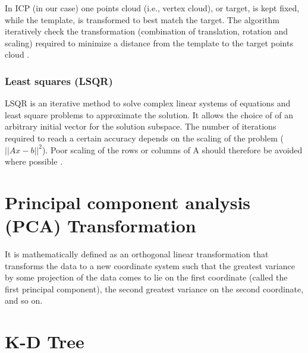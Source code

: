 \documentclass[../structure.tex]{subfiles}
\begin{document}
In ICP (in our case) one points cloud (i.e., vertex cloud), or target, is kept fixed, while the template, is transformed to best match the target. The algorithm iteratively check the transformation (combination of translation, rotation and scaling) required to minimize a distance from the template to the target points cloud \cite{Zhang1994}. 

		 \subsubsection{Least squares (LSQR)}
		 LSQR is an iterative method to solve complex linear systems of equations and least square problems to approximate the solution. It allows the choice of of an arbitrary initial vector for the solution subspace. The number of iterations required to reach a certain accuracy depends on the scaling of the problem ($ ||Ax-b||^2 $).  Poor scaling of the rows or columns of A should therefore be avoided where possible \cite{Paige1982}.

\section{Principal component analysis (PCA) Transformation}

It is mathematically defined as an orthogonal linear transformation that transforms the data to a new coordinate system such that the greatest variance by some projection of the data comes to lie on the first coordinate (called the first principal component), the second greatest variance on the second coordinate, and so on\cite{Jolliffe2002}.

\section{K-D Tree}
\end{document}
